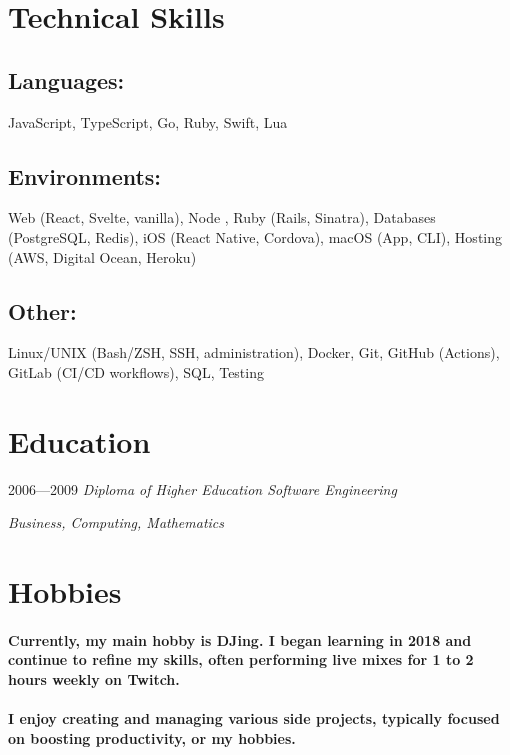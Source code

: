 \section{Technical Skills}

\subsection{Languages:} JavaScript, TypeScript, Go, Ruby, Swift, Lua

\subsection{Environments:} Web (React, Svelte, vanilla), Node , Ruby (Rails,
Sinatra), Databases (PostgreSQL, Redis), iOS (React Native, Cordova),
macOS (App, CLI), Hosting (AWS, Digital Ocean, Heroku)

\subsection{Other:} Linux/UNIX (Bash/ZSH, SSH, administration), Docker, Git,
GitHub (Actions), GitLab (CI/CD workflows), SQL, Testing

\clearpage

\section{Education}

{2006---2009}
\textit{Diploma of Higher Education Software Engineering}

\textit{Business, Computing, Mathematics}

\section{Hobbies}
\paragraph{Currently, my main hobby is DJing. I began learning in 2018 and
continue to refine my skills, often performing live mixes for 1 to 2 hours
weekly on Twitch.}

\paragraph{I enjoy creating and managing various side projects, typically
focused on boosting productivity, or my hobbies.}

